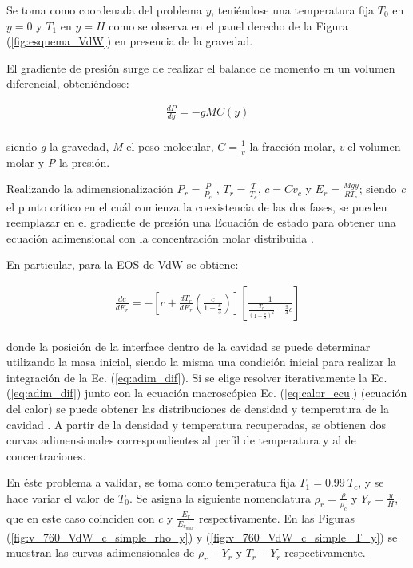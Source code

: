 Se toma como coordenada del problema \textit{y}, teniéndose una temperatura fija $T_{0}$ en $y = 0$ y $T_{1}$ en $y = H$ como se observa en el panel derecho de la Figura (\ref{fig:esquema_VdW}) en presencia de la gravedad.

El gradiente de presión surge de realizar el balance de momento en un volumen diferencial, obteniéndose:

\begin{align}
	\frac{d P}{d y} = - g M C(y)
\end{align}\\
siendo \textit{g} la gravedad, \textit{M} el peso molecular, $C = \frac{1}{v}$ la fracción molar, \textit{v} el volumen molar y \textit{P} la presión.

Realizando la adimensionalización $ P_r = \frac{P}{P_c}$ , $ T_r = \frac{T}{T_c}$, $c = C v_c$ y $E_r = \frac{M g y}{R T_c}$; siendo \textit{c} el punto crítico en el cuál comienza la coexistencia de las dos fases, se pueden reemplazar en el gradiente de presión una Ecuación de estado para obtener una ecuación adimensional con la concentración molar distribuida \cite{fogliatto2019simulation}.



En particular, para la EOS de VdW se obtiene:

\begin{align}
	\frac{d c}{d E_r} = - \left[ c + \frac{d T_r}{d E_r} \left( \frac{c}{1 - \frac{c}{3}}\right) \right] \left[	\frac{1}{\frac{T_r}{{\left(1- \frac{c}{3}\right)}^2} - \frac{9}{4} c}  \right] 
	\label{eq:adim_dif}
\end{align}\\ 
donde la posición de la interface dentro de la cavidad se puede determinar utilizando la masa inicial, siendo la misma una condición inicial para realizar la integración de la Ec. (\ref{eq:adim_dif}). Si se elige  resolver iterativamente la Ec. (\ref{eq:adim_dif}) junto con la ecuación macroscópica Ec. (\ref{eq:calor_ecu}) (ecuación del calor) se puede obtener las distribuciones de densidad y temperatura de la cavidad \cite{fogliatto2019simulation}. A partir de la densidad y temperatura recuperadas, se obtienen dos curvas adimensionales correspondientes al perfil de temperatura y al de concentraciones. 

En éste problema a validar, se toma como temperatura fija $T_1 = 0.99 \> T_c$, y se hace variar el valor de  $T_0$. Se asigna la siguiente nomenclatura $\rho_r = \frac{\rho}{\rho_c}$ y  $Y_r = \frac{y}{H}$, que en este caso coinciden con $c$ y $\frac{E_r}{E_{r_{max}}}$ respectivamente. En las Figuras (\ref{fig:v_760_VdW_c_simple_rho_y}) y (\ref{fig:v_760_VdW_c_simple_T_y}) se muestran las curvas adimensionales de $ \rho_r - Y_r $ y $ T_r - Y_r $ respectivamente.
\newline

